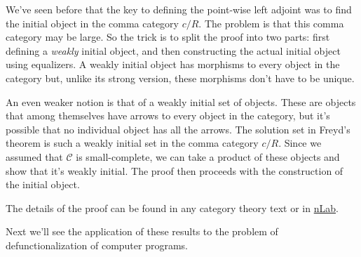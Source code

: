 \documentclass[11pt]{amsart}
\begin{document}
We've seen before that the key to defining the point-wise left adjoint was to find the initial object in the comma category $c/R$. The problem is that this comma category may be large. So the trick is to split the proof into two parts: first defining a \emph{weakly} initial object, and then constructing the actual initial object using equalizers. A weakly initial object has morphisms to every object in the category but, unlike its strong version, these morphisms don't have to be unique. 

An even weaker notion is that of a weakly initial set of objects. These are objects that among themselves have arrows to every object in the category, but it's possible that no individual object has all the arrows. The solution set in Freyd's theorem is such a weakly initial set in the comma category $c/R$. Since we assumed that $\mathcal C$ is small-complete, we can take a product of these objects and show that it's weakly initial. The proof then proceeds with the construction of the initial object. 

The details of the proof can be found in any category theory text or in \href{https://ncatlab.org/nlab/show/adjoint+functor+theorem}{nLab}. 

Next we'll see the application of these results to the problem of defunctionalization of computer programs.
\end{document}
